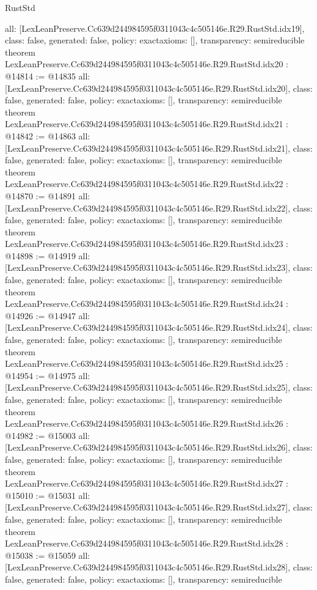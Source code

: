 \begin{lexlean}{RustStd}
\begin{coremodule}
{  all: [LexLeanPreserve.Cc639d244984595f0311043c4c505146e.R29.RustStd.idx19],
  class: false,
  generated: false,
  policy: exact{axioms: []},
  transparency: semireducible
}
theorem LexLeanPreserve.Cc639d244984595f0311043c4c505146e.R29.RustStd.idx20 : @14814 := @14835 {
  all: [LexLeanPreserve.Cc639d244984595f0311043c4c505146e.R29.RustStd.idx20],
  class: false,
  generated: false,
  policy: exact{axioms: []},
  transparency: semireducible
}
theorem LexLeanPreserve.Cc639d244984595f0311043c4c505146e.R29.RustStd.idx21 : @14842 := @14863 {
  all: [LexLeanPreserve.Cc639d244984595f0311043c4c505146e.R29.RustStd.idx21],
  class: false,
  generated: false,
  policy: exact{axioms: []},
  transparency: semireducible
}
theorem LexLeanPreserve.Cc639d244984595f0311043c4c505146e.R29.RustStd.idx22 : @14870 := @14891 {
  all: [LexLeanPreserve.Cc639d244984595f0311043c4c505146e.R29.RustStd.idx22],
  class: false,
  generated: false,
  policy: exact{axioms: []},
  transparency: semireducible
}
theorem LexLeanPreserve.Cc639d244984595f0311043c4c505146e.R29.RustStd.idx23 : @14898 := @14919 {
  all: [LexLeanPreserve.Cc639d244984595f0311043c4c505146e.R29.RustStd.idx23],
  class: false,
  generated: false,
  policy: exact{axioms: []},
  transparency: semireducible
}
theorem LexLeanPreserve.Cc639d244984595f0311043c4c505146e.R29.RustStd.idx24 : @14926 := @14947 {
  all: [LexLeanPreserve.Cc639d244984595f0311043c4c505146e.R29.RustStd.idx24],
  class: false,
  generated: false,
  policy: exact{axioms: []},
  transparency: semireducible
}
theorem LexLeanPreserve.Cc639d244984595f0311043c4c505146e.R29.RustStd.idx25 : @14954 := @14975 {
  all: [LexLeanPreserve.Cc639d244984595f0311043c4c505146e.R29.RustStd.idx25],
  class: false,
  generated: false,
  policy: exact{axioms: []},
  transparency: semireducible
}
theorem LexLeanPreserve.Cc639d244984595f0311043c4c505146e.R29.RustStd.idx26 : @14982 := @15003 {
  all: [LexLeanPreserve.Cc639d244984595f0311043c4c505146e.R29.RustStd.idx26],
  class: false,
  generated: false,
  policy: exact{axioms: []},
  transparency: semireducible
}
theorem LexLeanPreserve.Cc639d244984595f0311043c4c505146e.R29.RustStd.idx27 : @15010 := @15031 {
  all: [LexLeanPreserve.Cc639d244984595f0311043c4c505146e.R29.RustStd.idx27],
  class: false,
  generated: false,
  policy: exact{axioms: []},
  transparency: semireducible
}
theorem LexLeanPreserve.Cc639d244984595f0311043c4c505146e.R29.RustStd.idx28 : @15038 := @15059 {
  all: [LexLeanPreserve.Cc639d244984595f0311043c4c505146e.R29.RustStd.idx28],
  class: false,
  generated: false,
  policy: exact{axioms: []},
  transparency: semireducible
}
\end{coremodule}
\end{lexlean}
